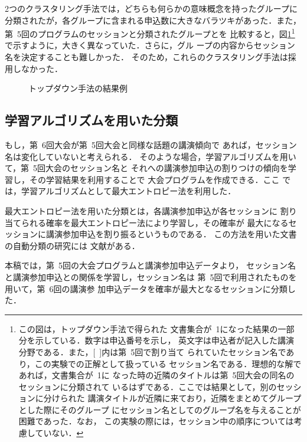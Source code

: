 2つのクラスタリング手法では，どちらも何らかの意味概念を持ったグループに
分類されたが，各グループに含まれる申込数に大きなバラツキがあった．また，
第\ 5回のプログラムのセッションと分類されたグループとを
比較すると，図\ref{top}\footnote{この図は，トップダウン手法で得られた
文書集合が\ 1になった結果の一部分を示している．数字は申込番号を示し，
英文字は申込者が記入した講演分野である．また，[\ ]内は第\ 5回で割り当て
られていたセッション名であり，この実験での正解として扱っている
セッション名である．理想的な解であれば，文書集合が\ 1に
なった時の近隣のタイトルは第\ 5回大会の同名のセッションに分類されて
いるはずである．ここでは結果として，別のセッションに分けられた
講演タイトルが近隣に来ており，近隣をまとめてグループとした際にそのグループ
にセッション名としてのグループ名を与えることが困難であった．なお，
この実験の際には，セッション中の順序については考慮していない．}
で示すように，大きく異なっていた．さらに，グル
ープの内容からセッション名を決定することも難しかった．
そのため，これらのクラスタリング手法は採用しなかった．

\begin{figure}
\begin{center}
\end{center}
\caption[図]{\label{top}トップダウン手法の結果例}
\end{figure}

\subsection{学習アルゴリズムを用いた分類}
\label{saidai}
もし，第\ 6回大会が第\ 5回大会と同様な話題の講演傾向で
あれば，セッション名は変化していないと考えられる．
そのような場合，学習アルゴリズムを用いて，第\ 5回大会のセッション名と
それへの講演参加申込の割りつけの傾向を学習し，その学習結果を利用することで
大会プログラムを作成できる．ここ
では，学習アルゴリズムとして最大エントロピー法を利用した．

最大エントロピー法を用いた分類とは，各講演参加申込が各セッションに
割り当てられる確率を最大エントロピー法により学習し，その確率が
最大になるセッションに講演参加申込を割り振るというものである．
この方法を用いた文書の自動分類の研究には
文献\cite{Inui1998,Nigam1999}がある．

本稿では，第\ 5回の大会プログラムと講演参加申込データより，
セッション名と講演参加申込との関係を学習し，セッション名は
第\ 5回で利用されたものを用いて，第\ 6回の講演参
加申込データを確率が最大となるセッションに分類した．

